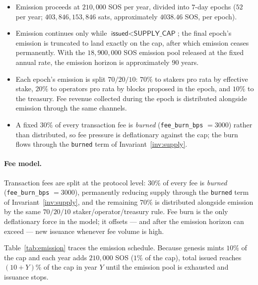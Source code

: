 \documentclass[11pt]{article}
\newcommand{\code}[1]{\texttt{#1}}
\theoremstyle{plain}
\theoremstyle{definition}
\theoremstyle{remark}
\begin{document}
\begin{itemize}[leftmargin=1.6em]
\item Emission proceeds at $210{,}000$ SOS per year, divided into $7$-day
  epochs ($52$ per year; $403{,}846{,}153{,}846$ sats, approximately
  $4038.46$ SOS, per epoch).
\item Emission continues only while
  $\textsf{issued} < \textsf{SUPPLY\_CAP}$; the final epoch's emission is
  truncated to land exactly on the cap, after which emission ceases
  permanently. With the $18{,}900{,}000$ SOS emission pool released at the
  fixed annual rate, the emission horizon is approximately $90$ years.
\item Each epoch's emission is split $70/20/10$: $70\%$ to stakers pro rata
  by effective stake, $20\%$ to operators pro rata by blocks proposed in the
  epoch, and $10\%$ to the treasury. Fee revenue collected during
  the epoch is distributed alongside emission through the same channels.
\item A fixed $30\%$ of every transaction fee is \emph{burned}
  (\code{fee\_burn\_bps} $=3000$) rather than distributed, so fee pressure is
  deflationary against the cap; the burn flows through the \code{burned} term
  of Invariant~\ref{inv:supply}.
\end{itemize}

\paragraph{Fee model.} Transaction fees are split at the protocol level: $30\%$
of every fee is \emph{burned} (\code{fee\_burn\_bps} $= 3000$), permanently
reducing supply through the \code{burned} term of Invariant~\ref{inv:supply},
and the remaining $70\%$ is distributed alongside emission by the same
$70/20/10$ staker/operator/treasury rule. Fee burn is the only deflationary
force in the model; it offsets --- and after the emission horizon can exceed
--- new issuance whenever fee volume is high.

Table~\ref{tab:emission} traces the emission schedule. Because genesis mints
$10\%$ of the cap and each year adds $210{,}000$ SOS ($1\%$ of the cap), total
issued reaches $(10+Y)\%$ of the cap in year $Y$ until the emission pool is
exhausted and issuance stops.
\end{document}
